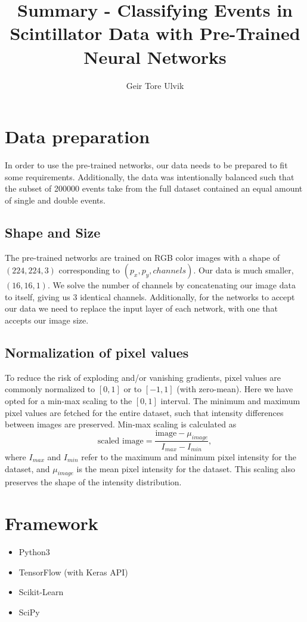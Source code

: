 \documentclass[12pt, notitlepage]{article}
\newcommand{\f}[2]{\frac{#1}{#2}}
\begin{document}
\title{Summary - Classifying Events in Scintillator Data with Pre-Trained Neural Networks}
\author{Geir Tore Ulvik}
\maketitle


\section{Data preparation}
In order to use the pre-trained networks, our data needs to be prepared to fit some requirements.
Additionally, the data was intentionally balanced such that the subset of 200000 events take from
the full dataset contained an equal amount of single and double events.
\subsection{Shape and Size}
The pre-trained networks are trained on RGB color images with a shape of $(224, 224, 3)$
corresponding to $(p_x, p_y, channels)$. Our data is much smaller, $(16, 16, 1)$. 
We solve the number of channels by concatenating our image data to itself, giving us 3 identical channels. 
Additionally, for the networks to accept our data we need to replace the input layer of each network,
with one that accepts our image size.
\subsection{Normalization of pixel values}
To reduce the risk of exploding and/or vanishing gradients, pixel values are commonly
normalized to $[0, 1]$ or to $[-1, 1]$ (with zero-mean). Here we have opted for a min-max scaling to the $[0, 1]$ interval.
The minimum and maximum pixel values are fetched for the entire dataset, such that intensity differences
between images are preserved. Min-max scaling is calculated as
\begin{equation}
    \text{scaled image} = \f{\text{image} - \mu_{image}}{I_{max} - I_{min}},
\end{equation}
where $I_{max}$ and $I_{min}$ refer to the maximum and minimum pixel intensity for the dataset,
and $\mu_{image}$ is the mean pixel intensity for the dataset. This scaling also preserves the
shape of the intensity distribution.

\section{Framework}
\begin{itemize}
    \item Python3
    \item TensorFlow (with Keras API)
    \item Scikit-Learn
    \item SciPy
\end{itemize}
\end{document}
